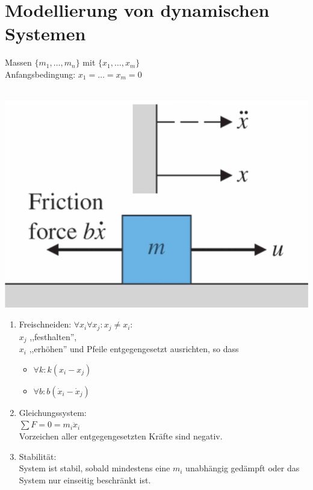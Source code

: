 \setcounter{section}{1}
\section{Modellierung von dynamischen Systemen}
\begin{tcolorbox}[colback=white!10!white,
                  colframe=blue!50!black,
                  title=KOCHREZEPT: Freischneiden]
    Massen $\{m_1,\hdots,m_n\}$ mit $\{x_1,\hdots,x_m\}$ \\
    Anfangsbedingung: $x_1 = \hdots = x_m = 0$ \\\\
    \begin{minipage}{0.3\textwidth}
        \centering
        \includegraphics[width=\textwidth]{images/free_body_diagram}
    \end{minipage}
    \begin{minipage}{0.65\textwidth}
        \begin{enumerate}
            \item Freischneiden: $\forall{x_i}\forall{x_j}: x_j \neq x_i :$ \\
                $x_j$ ,,festhalten'', \\
                $x_i$ ,,erhöhen'' und Pfeile entgegengesetzt ausrichten, so dass
                \begin{itemize}
                    \item $\forall k: k(x_i - x_j)$
                    \item $\forall b: b(\dot{x}_i - \dot{x}_j)$
                \end{itemize}
            \item Gleichungssystem: \\
                $\sum F = 0 = m_i \ddot{x}_i$ \\
                Vorzeichen aller entgegengesetzten Kräfte sind negativ.
            \item Stabilität: \\
                System ist stabil, sobald mindestens eine $m_i$ unabhängig 
                gedämpft oder das System nur einseitig beschränkt ist.
        \end{enumerate}
    \end{minipage}
\end{tcolorbox}

